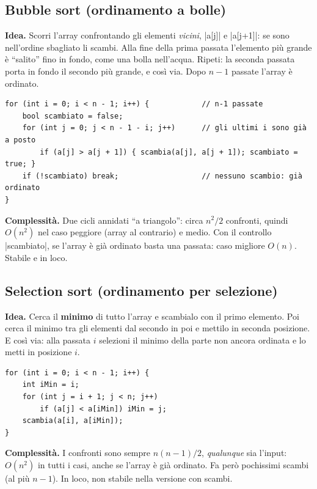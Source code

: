 \subsection*{Bubble sort (ordinamento a bolle)}

\textbf{Idea.} Scorri l'array confrontando gli elementi \emph{vicini}, \cc|a[j]| e
\cc|a[j+1]|: se sono nell'ordine sbagliato li scambi. Alla fine della prima passata
l'elemento più grande è ``salito'' fino in fondo, come una bolla nell'acqua. Ripeti:
la seconda passata porta in fondo il secondo più grande, e così via. Dopo $n-1$
passate l'array è ordinato.

\begin{lstlisting}
for (int i = 0; i < n - 1; i++) {            // n-1 passate
    bool scambiato = false;
    for (int j = 0; j < n - 1 - i; j++)      // gli ultimi i sono già a posto
        if (a[j] > a[j + 1]) { scambia(a[j], a[j + 1]); scambiato = true; }
    if (!scambiato) break;                   // nessuno scambio: già ordinato
}
\end{lstlisting}

\textbf{Complessità.} Due cicli annidati ``a triangolo'': circa $n^2/2$ confronti,
quindi $O(n^2)$ nel caso peggiore (array al contrario) e medio. Con il controllo
\cc|scambiato|, se l'array è già ordinato basta una passata: caso migliore $O(n)$.
Stabile e in loco.

\subsection*{Selection sort (ordinamento per selezione)}

\textbf{Idea.} Cerca il \textbf{minimo} di tutto l'array e scambialo con il primo
elemento. Poi cerca il minimo tra gli elementi dal secondo in poi e mettilo in
seconda posizione. E così via: alla passata $i$ selezioni il minimo della parte
non ancora ordinata e lo metti in posizione $i$.

\begin{lstlisting}
for (int i = 0; i < n - 1; i++) {
    int iMin = i;
    for (int j = i + 1; j < n; j++)
        if (a[j] < a[iMin]) iMin = j;
    scambia(a[i], a[iMin]);
}
\end{lstlisting}

\textbf{Complessità.} I confronti sono sempre $n(n-1)/2$, \emph{qualunque} sia
l'input: $O(n^2)$ in tutti i casi, anche se l'array è già ordinato. Fa però
pochissimi scambi (al più $n-1$). In loco, non stabile nella versione con scambi.

